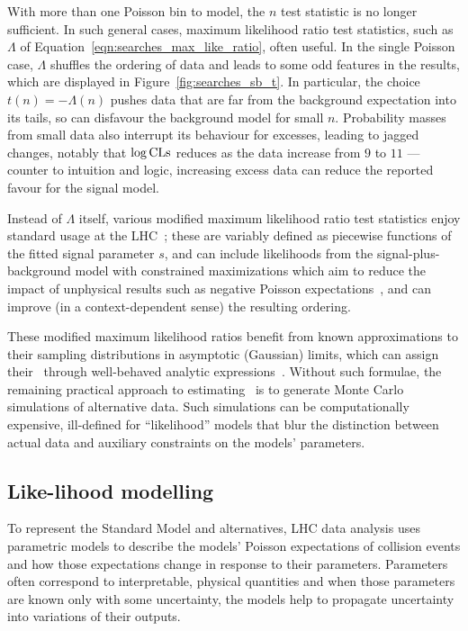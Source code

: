 With more than one Poisson bin to model, the $n$ test statistic is no longer
sufficient.
In such general cases, maximum likelihood ratio test statistics,
such as $\Lambda$ of Equation~\ref{eqn:searches_max_like_ratio}, often useful.
In the single Poisson case, $\Lambda$ shuffles the ordering of
data and leads to some odd features in the results, which are displayed in
Figure~\ref{fig:searches_sb_t}.
In particular, the choice $t(n) = -\Lambda(n)$ pushes data that are far from
the background expectation into its tails, so can disfavour the background
model for small $n$.
Probability masses from small data also interrupt its behaviour for excesses,
leading to jagged changes, notably that $\log\mathrm{CLs}$ reduces as the data
increase from $9$ to $11$ --- counter to intuition and logic, increasing excess
data can reduce the reported favour for the signal model.

Instead of $\Lambda$ itself, various modified maximum likelihood ratio test
statistics enjoy standard usage at the LHC~\cite{cern2011procedure};
these are variably defined as piecewise functions of the fitted signal
parameter $s$, and can include likelihoods from the signal-plus-background
model with constrained maximizations which aim to reduce the impact of
unphysical results such as negative Poisson expectations~\cite{
Feldman:1997qc,
Cowan:2010js
},
and can improve (in a context-dependent sense) the resulting ordering.

These modified maximum likelihood ratios benefit from known approximations to
their sampling distributions in asymptotic (Gaussian) limits,
which can assign their \pvalues\ through well-behaved analytic
expressions~\cite{Cowan:2010js}.
Without such formulae, the remaining practical approach to estimating
\pvalues\ is to generate Monte Carlo simulations of alternative data.
Such simulations can be computationally expensive, ill-defined for
``likelihood'' models that blur the distinction between actual data and
auxiliary constraints on the models' parameters.


\subsection{Like-lihood modelling}
To represent the Standard Model and alternatives, LHC data analysis uses
parametric models to describe the models' Poisson expectations of
collision events and how those expectations change in response to their
parameters.
Parameters often correspond to interpretable, physical quantities and when
those parameters are known only with some uncertainty, the models help to
propagate uncertainty into variations of their outputs.

